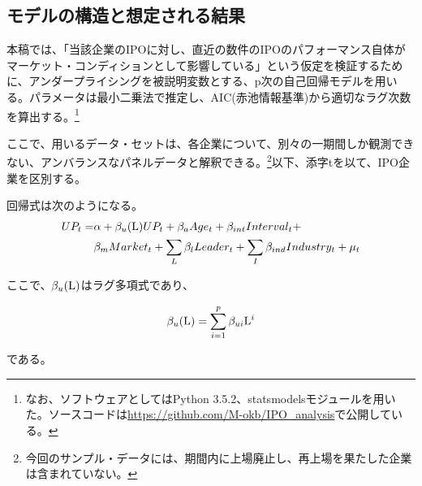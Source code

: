 \documentclass{jsarticle}
\begin{document}
\subsection{モデルの構造と想定される結果}
本稿では、「当該企業のIPOに対し、直近の数件のIPOのパフォーマンス自体がマーケット・コンディションとして影響している」という仮定を検証するために、アンダープライシングを被説明変数とする、p次の自己回帰モデルを用いる。パラメータは最小二乗法で推定し、AIC(赤池情報基準)から適切なラグ次数を算出する。\footnote[11]{なお、ソフトウェアとしてはPython 3.5.2、statsmodelsモジュールを用いた。ソースコードは\url{https://github.com/M-okb/IPO_analysis}で公開している。}\par
ここで、用いるデータ・セットは、各企業について、別々の一期間しか観測できない、アンバランスなパネルデータと解釈できる。\footnote[12]{今回のサンプル・データには、期間内に上場廃止し、再上場を果たした企業は含まれていない。}以下、添字tを以て、IPO企業を区別する。\par
回帰式は次のようになる。
\begin{equation}
\label{reg}
\begin{split}
	UP_t = &\alpha + \beta_u ({\rm L}) UP_t + \beta_a Age_t + \beta_{int} Interval_t + \\
	 &\beta_m Market_t + \sum_{L} \beta_l Leader_t +  \sum_{I} \beta_{ind} Industry_t + \mu_t
\end{split}
\end{equation}
\par
ここで、$\beta_u({\rm L})$はラグ多項式であり、\par
\begin{equation}
\beta_u({\rm L}) = \sum_{i=1}^p \beta_{ui} {\rm L}^i \nonumber
\end{equation}\par
である。\\ \par
\end{document}
